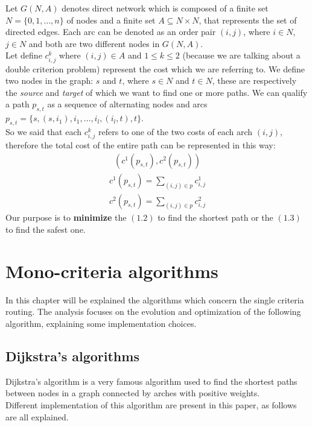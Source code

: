 \documentclass[a4paper,11pt]{report}
\begin{document}
Let $G(N,A)$ denotes direct network which is composed of a finite set $N=\{0,1, \dots, n\}$ of nodes and a finite set $A \subseteq N\times N $, that represents the set of directed edges. Each arc can be denoted as an order pair $(i,j)$, where $i\in N$, $j \in N$ and both are two different nodes in $G(N,A)$.\\
Let define $c^k_{i,j}$ where $(i,j)\in A$ and $1\leq k \leq 2$ (because we are talking about a double criterion problem) represent the cost which we are referring to. We define two nodes in the graph: $s$ and $t$, where $s \in N$ and $t \in N$, these are respectively the \textit{source} and \textit{target} of which we want to find one or more paths.
We can qualify a path $p_{s,t}$ as a sequence  of  alternating nodes and arcs $p_{s,t} = \{s, (s, i_1), i_1, \dots, i_{l}, (i_l,t), t\}$.\\
So we said that each $c^k_{i,j}$ refers to one of the two costs of each arch $(i,j)$, therefore the total cost of the entire path can be represented in this way:\\

\begin{gather}(c^1(p_{s,t}), c^2(p_{s,t}))\end{gather}
\begin{gather}c^1(p_{s,t})=\sum_{(i,j)\in p}c^1_{i,j}\end{gather}
\begin{gather}c^2(p_{s,t})=\sum_{(i,j)\in p}c^2_{i,j}\end{gather}
Our purpose is to \textbf{minimize} the $(1.2)$ to find the shortest path or the $(1.3)$ to find the safest one.

\chapter{Mono-criteria algorithms}

In this chapter will be explained the algorithms which concern the single criteria routing.
The analysis focuses on the evolution and optimization of the following algorithm, explaining some implementation choices.

\section{Dijkstra's algorithms}

Dijkstra's algorithm is a very famous algorithm used to find the shortest paths between nodes in a graph connected by arches with positive weights.\\
Different implementation of this algorithm are present in this paper, as follows are all explained.
\end{document}
